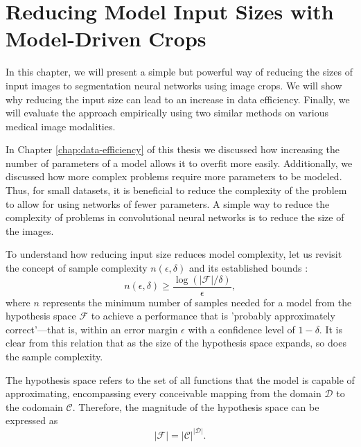 
\chapter{Reducing Model Input Sizes with Model-Driven Crops}
\label{chap:reducing-input-size}

In this chapter, we will present a simple but powerful way of reducing the sizes of input images to segmentation neural networks using image crops. We will show why reducing the input size can lead to an increase in data efficiency. Finally, we will evaluate the approach empirically using two similar methods on various medical image modalities.

In Chapter \ref{chap:data-efficiency} of this thesis we discussed how increasing the number of parameters of a model allows it to overfit more easily. Additionally, we discussed how more complex problems require more parameters to be modeled. Thus, for small datasets, it is beneficial to reduce the complexity of the problem to allow for using networks of fewer parameters. A simple way to reduce the complexity of problems in convolutional neural networks is to reduce the size of the images.

To understand how reducing input size reduces model complexity, let us revisit the concept of sample complexity \(n(\epsilon, \delta)\) and its established bounds \cite{shalev-shwartzUnderstandingMachineLearning2014}:
\begin{equation}
	n(\epsilon, \delta) \geq \frac{\log(\lvert \mathcal{F} \rvert / \delta)}{\epsilon},
\end{equation}
where \(n\) represents the minimum number of samples needed for a model from the hypothesis space \(\mathcal{F}\) to achieve a performance that is 'probably approximately correct'—that is, within an error margin \(\epsilon\) with a confidence level of \(1 - \delta\). It is clear from this relation that as the size of the hypothesis space expands, so does the sample complexity.

The hypothesis space refers to the set of all functions that the model is capable of approximating, encompassing every conceivable mapping from the domain \(\mathcal{D}\) to the codomain \(\mathcal{C}\). Therefore, the magnitude of the hypothesis space can be expressed as
\begin{equation}
	\lvert \mathcal{F} \rvert = {\lvert \mathcal{C} \rvert}^{\lvert \mathcal{D} \rvert}.
\end{equation}

